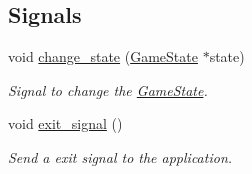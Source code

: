 \subsection*{Signals}
\begin{DoxyCompactItemize}
\item 
\hypertarget{class_game_state_ad23b11eedef61cd2f24cca1f89c4088a}{void \hyperlink{class_game_state_ad23b11eedef61cd2f24cca1f89c4088a}{change\-\_\-state} (\hyperlink{class_game_state}{Game\-State} $\ast$state)}\label{class_game_state_ad23b11eedef61cd2f24cca1f89c4088a}

\begin{DoxyCompactList}\small\item\em Signal to change the \hyperlink{class_game_state}{Game\-State}. \end{DoxyCompactList}\item 
\hypertarget{class_game_state_afd2827b7fa9f6d7fe5cdaeb991c510a9}{void \hyperlink{class_game_state_afd2827b7fa9f6d7fe5cdaeb991c510a9}{exit\-\_\-signal} ()}\label{class_game_state_afd2827b7fa9f6d7fe5cdaeb991c510a9}

\begin{DoxyCompactList}\small\item\em Send a exit signal to the application. \end{DoxyCompactList}\end{DoxyCompactItemize}
